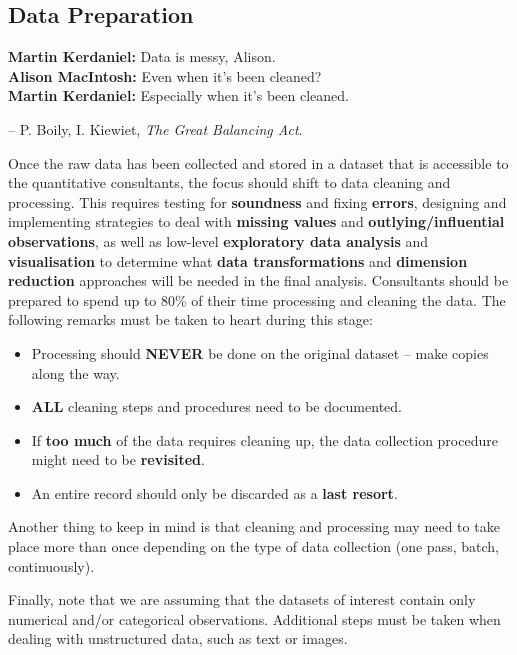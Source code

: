 \subsection{Data Preparation}\label{sec:DP}
\begin{tcolorbox}[title=Data Validation]
\textbf{Martin Kerdaniel:} Data is messy, Alison.  \\ 
\textbf{Alison MacIntosh:} Even when it's been cleaned?  \\ 
\textbf{Martin Kerdaniel:} Especially when it's been cleaned.\\[-0.6cm]
\begin{flushright}
-- P. Boily, I. Kiewiet, \textit{The Great Balancing Act}.
\end{flushright}
\end{tcolorbox}
\noindent
Once the raw data has been collected and stored in a dataset that is accessible to the quantitative consultants, the focus should shift to data cleaning and processing.  This requires testing for \textbf{soundness} and fixing \textbf{errors}, designing and implementing strategies to deal with \textbf{missing values} and \textbf{outlying/influential observations}, as well as low-level \textbf{exploratory data analysis} and \textbf{visualisation} to determine what \textbf{data transformations} and \textbf{dimension reduction} approaches will be needed in the final analysis. Consultants should be prepared to spend up to 80\% of their time processing and cleaning the data.  
\newl 
The following remarks must be taken to heart during this stage: 
\begin{itemize}[noitemsep]
\item Processing should \textbf{NEVER} be done on the original dataset -- make copies along the way.
\item {\textbf{ALL}} cleaning steps and procedures need to be documented.
\item If \textbf{too much} of the data requires cleaning up, the data collection procedure might need to be \textbf{revisited}.
\item An entire record should only be discarded as a \textbf{last resort}.
\end{itemize}
Another thing to keep in mind is that cleaning and processing may need to take place more than once depending on the type of data collection (one pass, batch, continuously). \par Finally, note that we are assuming that the datasets of interest contain only numerical and/or categorical observations. Additional steps must be taken when dealing with unstructured data, such as text or images.  

